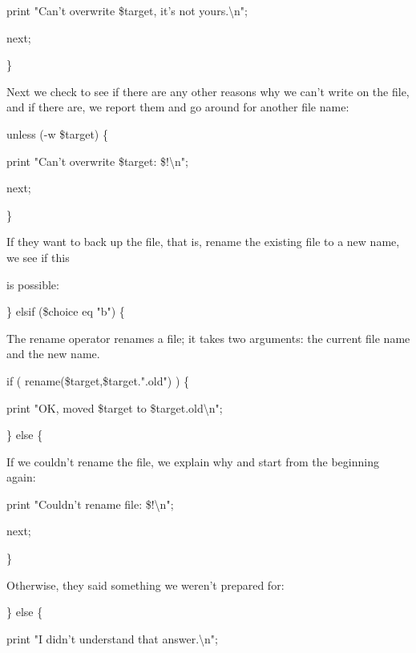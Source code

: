 \documentclass[a4paper,11pt]{book}
\begin{document}
\noindent print "Can't overwrite \$target, it's not yours.\textbackslash n";

\noindent next;

\noindent \}

\noindent 

\noindent Next we check to see if there are any other reasons why we can't write on the file, and if there are, we report them and go around for another file name:

\noindent 

\noindent unless (-w \$target) \{

\noindent print "Can't overwrite \$target: \$!\textbackslash n";

\noindent next;

\noindent \}

\noindent 

\noindent If they want  to  back up the file,  that  is,  rename  the  existing  file  to  a  new name,  we  see if  this

\noindent is possible:

\noindent 

\noindent \} elsif (\$choice eq "b") \{

\noindent 

\noindent The rename operator renames a file; it takes two arguments: the current file name and the new name.

\noindent 

\noindent if ( rename(\$target,\$target.".old") ) \{

\noindent print "OK, moved \$target to \$target.old\textbackslash n";

\noindent \} else \{

\noindent 

\noindent If we couldn't rename the file, we explain why and start from the beginning again:

\noindent 

\noindent print "Couldn't rename file: \$!\textbackslash n";

\noindent next;

\noindent \}

\noindent 

\noindent 

\noindent Otherwise, they said something we weren't prepared for:

\noindent 

\noindent 

\noindent \} else \{

\noindent print "I didn't understand that answer.\textbackslash n";
\end{document}
